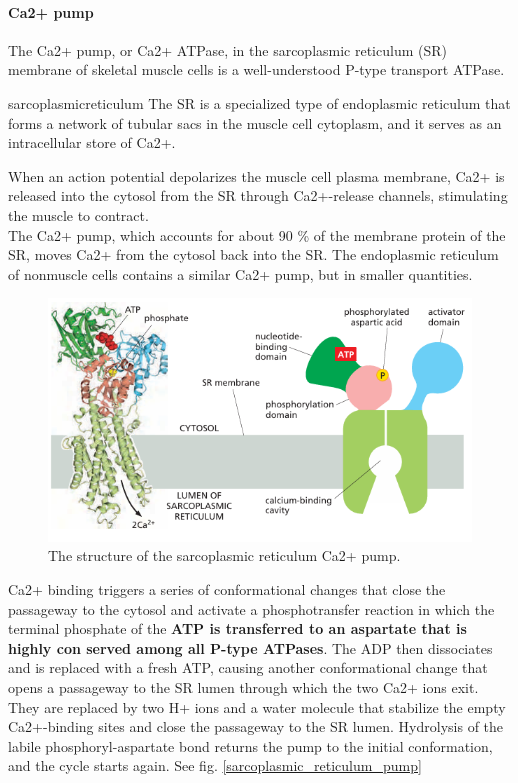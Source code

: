 \documentclass[../main.tex]{subfiles}
\begin{document}
\paragraph{Ca2+ pump}
The Ca2+ pump, or Ca2+ ATPase, in the sarcoplasmic reticulum (SR) membrane of skeletal muscle cells is a well-understood P-type transport ATPase.
\begin{RemarkWithTitel}{\gls{sarcoplasmicreticulum}}
	The SR is a specialized type of endoplasmic reticulum that forms a network of tubular sacs in the muscle cell cytoplasm, and it serves as an intracellular store of Ca2+. 
\end{RemarkWithTitel}
When an action potential depolarizes the muscle cell plasma membrane, Ca2+ is released into the cytosol from the SR through Ca2+-release channels, stimulating the muscle to contract. \\
The Ca2+ pump, which accounts for about 90 \% of the membrane protein of the SR, moves Ca2+ from the cytosol back into the SR. The endoplasmic reticulum of nonmuscle cells contains a similar Ca2+ pump, but in smaller quantities.
\begin{figure}[H]
	\centering
	\includegraphics[width = 0.6 \textwidth]{16}
	\caption{The structure of the sarcoplasmic reticulum Ca2+ pump.}
\end{figure}
Ca2+ binding triggers a series of conformational changes that close the passageway to the cytosol and activate a phosphotransfer reaction in which the terminal phosphate of the \textbf{ATP is transferred to an aspartate that is highly con served among all P-type ATPases}. The ADP then dissociates and is replaced with a fresh ATP, causing another conformational change that opens a passageway to the SR lumen through which the two Ca2+ ions exit. They are replaced by two H+ ions and a water molecule that stabilize the empty Ca2+-binding sites and close the passageway to the SR lumen. Hydrolysis of the labile phosphoryl-aspartate bond returns the pump to the initial conformation, and the cycle starts again. See fig. \ref{sarcoplasmic_reticulum_pump}
\end{document}
